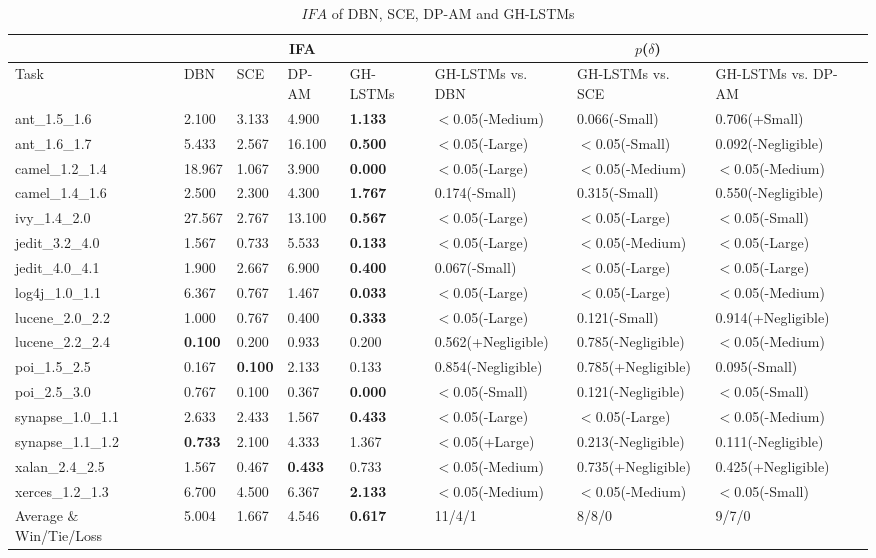 \documentclass[journal]{IEEEtran}
\begin{document}
\begin{table}[t]
	\scriptsize
	\caption{$IFA$ of DBN, SCE, DP-AM and GH-LSTMs}
	\label{tab_ifa}
	\tabcolsep 9pt
	\centering
	\begin{tabular}{m{2cm}|llll|lll}
		\toprule
		&\multicolumn{4}{c|}{IFA}  &\multicolumn{3}{c}{$p$($\delta$)}   \\\midrule
		Task  &DBN  &SCE  &DP-AM  &GH-LSTMs  &GH-LSTMs vs. DBN  &GH-LSTMs vs. SCE  &GH-LSTMs vs. DP-AM   \\\midrule
		ant\_1.5\_1.6     &2.100     &3.133     &4.900     &\textbf{1.133}&$<$0.05(-Medium)&0.066(-Small)&0.706(+Small)\\
		ant\_1.6\_1.7     &5.433     &2.567     &16.100    &\textbf{0.500}&$<$0.05(-Large)&$<$0.05(-Small)&0.092(-Negligible)\\
		camel\_1.2\_1.4   &18.967    &1.067     &3.900     &\textbf{0.000}&$<$0.05(-Large)&$<$0.05(-Medium)&$<$0.05(-Medium)\\
		camel\_1.4\_1.6   &2.500     &2.300     &4.300     &\textbf{1.767}&0.174(-Small)&0.315(-Small)&0.550(-Negligible)\\
		ivy\_1.4\_2.0     &27.567    &2.767     &13.100    &\textbf{0.567}&$<$0.05(-Large)&$<$0.05(-Large)&$<$0.05(-Small)\\
		jedit\_3.2\_4.0   &1.567     &0.733     &5.533     &\textbf{0.133}&$<$0.05(-Large)&$<$0.05(-Medium)&$<$0.05(-Large)\\
		jedit\_4.0\_4.1   &1.900     &2.667     &6.900     &\textbf{0.400}&0.067(-Small)&$<$0.05(-Large)&$<$0.05(-Large)\\
		log4j\_1.0\_1.1   &6.367     &0.767     &1.467     &\textbf{0.033}&$<$0.05(-Large)&$<$0.05(-Large)&$<$0.05(-Medium)\\
		lucene\_2.0\_2.2  &1.000     &0.767     &0.400     &\textbf{0.333}&$<$0.05(-Large)&0.121(-Small)&0.914(+Negligible)\\
		lucene\_2.2\_2.4  &\textbf{0.100}&0.200     &0.933     &0.200     &0.562(+Negligible)&0.785(-Negligible)&$<$0.05(-Medium)\\
		poi\_1.5\_2.5     &0.167     &\textbf{0.100}&2.133     &0.133     &0.854(-Negligible)&0.785(+Negligible)&0.095(-Small)\\
		poi\_2.5\_3.0     &0.767     &0.100     &0.367     &\textbf{0.000}&$<$0.05(-Small)&0.121(-Negligible)&$<$0.05(-Small)\\
		synapse\_1.0\_1.1 &2.633     &2.433     &1.567     &\textbf{0.433}&$<$0.05(-Large)&$<$0.05(-Large)&$<$0.05(-Medium)\\
		synapse\_1.1\_1.2 &\textbf{0.733}&2.100     &4.333     &1.367     &$<$0.05(+Large)&0.213(-Negligible)&0.111(-Negligible)\\
		xalan\_2.4\_2.5   &1.567     &0.467     &\textbf{0.433}&0.733     &$<$0.05(-Medium)&0.735(+Negligible)&0.425(+Negligible)\\
		xerces\_1.2\_1.3  &6.700     &4.500     &6.367     &\textbf{2.133}&$<$0.05(-Medium)&$<$0.05(-Medium)&$<$0.05(-Small)\\\midrule
		Average $\&$ Win/Tie/Loss&5.004&1.667&4.546&\textbf{0.617}&11/4/1&8/8/0&9/7/0\\
		\bottomrule
	\end{tabular}
\end{table}
\end{document}
